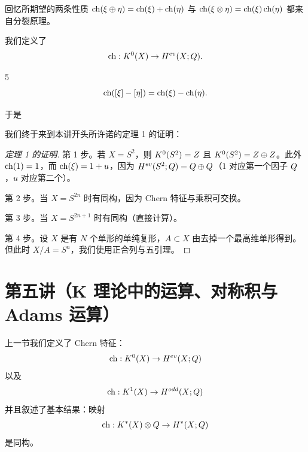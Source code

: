 回忆所期望的两条性质 $\operatorname{ch}(\xi\oplus\eta) = \operatorname{ch}(\xi)+\operatorname{ch}(\eta)$ 与 $\operatorname{ch}(\xi\otimes\eta) = \operatorname{ch}(\xi)\operatorname{ch}(\eta)$ 都来自分裂原理。

我们定义了
\[ \operatorname{ch} : K^0(X)\to H^{ev}(X;Q). \]

\begin{defn}{5}
\[ \operatorname{ch}([\xi]-[\eta]) = \operatorname{ch}(\xi)-\operatorname{ch}(\eta). \]
\end{defn}

于是
\begin{center}
\end{center}

我们终于来到本讲开头所许诺的定理 1 的证明：

\begin{proof}[定理 1 的证明]
第 1 步。若 $X = S^2$，则 $ K^0(S^2) = Z$ 且 $K^0(S^2) = Z\oplus Z$。此外 $\operatorname{ch}(1) = 1$，而 $\operatorname{ch}(\xi) = 1+u$，因为 $H^{ev}(S^2;Q) = Q\oplus Q$（$1$ 对应第一个因子 $Q$，$u$ 对应第二个）。

第 2 步。当 $X = S^{2n}$ 时有同构，因为 Chern 特征与乘积可交换。

第 3 步。当 $X = S^{2n+1}$ 时有同构（直接计算）。

第 4 步。设 $X$ 是有 $N$ 个单形的单纯复形，$A\subset X$ 由去掉一个最高维单形得到。但此时 $X/A = S^n$，我们使用正合列与五引理。
\end{proof}

\section{第五讲（K 理论中的运算、对称积与 Adams 运算）}

上一节我们定义了 Chern 特征：
\[ \operatorname{ch} : K^0(X)\to H^{ev}(X;Q) \]
以及
\[ \operatorname{ch} : K^1(X)\to H^{odd}(X;Q) \]
并且叙述了基本结果：映射
\[ \operatorname{ch} : K^*(X)\otimes Q\to H^*(X;Q) \]
是同构。

